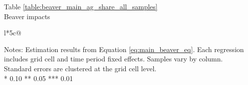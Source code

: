 \begin{table}[htb]
\captionlistentry[table]{}
\label{table:beaver_main_ag_share_all_samples}
\centering
Table \ref{table:beaver_main_ag_share_all_samples} \\
Beaver impacts \\
\begin{threeparttable}
\begin{tabulary}{\textwidth}{l*{5}{c}@{}}
\toprule \toprule
\noalign{\smallskip}
\noalign{\smallskip}
\midrule \bottomrule
\end{tabulary}
\medskip
\begin{tablenotes}[flushleft]
\setlength{}
\item
\footnotesize
\justify
Notes: Estimation results from Equation \eqref{eq:main_beaver_eq}.
Each regression includes grid cell and time period fixed effects.
Samples vary by column.
Standard errors are clustered at the grid cell level.  \\
\mbox{*} 0.10 ** 0.05 *** 0.01
\end{tablenotes}
\end{threeparttable}
\end{table}
